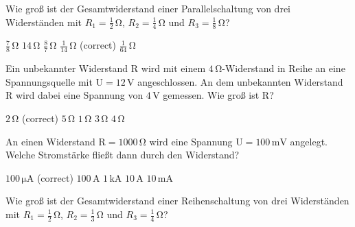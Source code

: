 \documentclass[11pt]{exam}
\begin{document}
\setlength{\voffset}{-0.5in}
\setlength{\headsep}{5pt}

\hspace{2mm}
 \hspace{5mm}
\vspace{4mm}

\begin{questions}

\question Wie groß ist der Gesamtwiderstand einer Parallelschaltung von drei Widerständen mit \(R_1=\mathrm{\frac{1}{2}\,\Omega}\), \(R_2=\mathrm{\frac{1}{4}\,\Omega}\) und \(R_3=\mathrm{\frac{1}{8}\,\Omega}\)?

\begin{choices}
	\choice \(\mathrm{\frac{7}{8}\,\Omega}\)
	\choice \(\mathrm{14\,\Omega}\)
	\choice \(\mathrm{\frac{8}{7}\,\Omega}\)
	\choice \(\mathrm{\frac{1}{14}\,\Omega}\) (correct)
	\choice \(\mathrm{\frac{1}{64}\,\Omega}\)
\end{choices}

\vspace{3mm}\question Ein unbekannter Widerstand \(\mathrm{R}\) wird mit einem \(\mathrm{4\,\Omega}\)-Widerstand in Reihe an eine Spannungsquelle mit \(\mathrm{U=12\,V}\) angeschlossen. An dem unbekannten Widerstand \(\mathrm{R}\) wird dabei eine Spannung von \(\mathrm{4\,V}\) gemessen. Wie groß ist \(\mathrm{R}\)?

\begin{choices}
	\choice \(\mathrm{2\,\Omega}\) (correct)
	\choice \(\mathrm{5\,\Omega}\)
	\choice \(\mathrm{1\,\Omega}\)
	\choice \(\mathrm{3\,\Omega}\)
	\choice \(\mathrm{4\,\Omega}\)
\end{choices}

\vspace{3mm}\question An einen Widerstand \(\mathrm{R=1000\,\Omega}\) wird eine Spannung \(\mathrm{U=100\,mV}\) angelegt. Welche Stromstärke fließt dann durch den Widerstand?

\begin{choices}
	\choice \(\mathrm{100\,\mu A}\) (correct)
	\choice \(\mathrm{100\,A}\)
	\choice \(\mathrm{1\,kA}\)
	\choice \(\mathrm{10\,A}\)
	\choice \(\mathrm{10\,mA}\)
\end{choices}

\vspace{3mm}\question Wie groß ist der Gesamtwiderstand einer Reihenschaltung von drei Widerständen mit \(R_1=\mathrm{\frac{1}{2}\,\Omega}\), \(R_2=\mathrm{\frac{1}{3}\,\Omega}\) und \(R_3=\mathrm{\frac{1}{4}\,\Omega}\)?


\end{questions}
\end{document}
